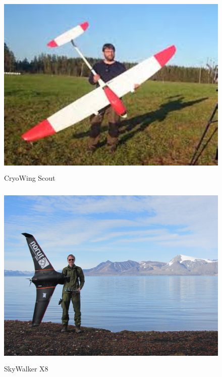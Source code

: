 \documentclass[12pt, a4paper]{article}
\begin{document}
\begin{figure}[h!]
	\centering
	\includegraphics[width=.6\textwidth, height=9cm]{bilder/CryoWing_Scout.jpeg}
	\caption{CryoWing Scout}
\end{figure}

\newpage

\begin{figure}[hpbt]
	\centering
	\includegraphics[width=.6\textwidth, height=9cm]{bilder/SkyWalker_X8.jpg}
	\caption{SkyWalker X8}
\end{figure}
\end{document}

